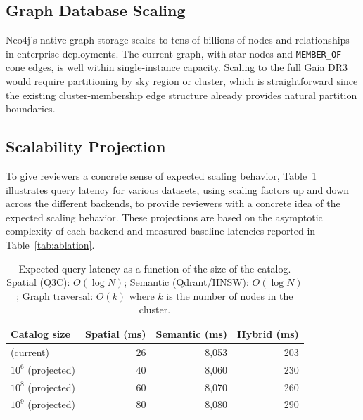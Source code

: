 \documentclass[preprint,12pt,authoryear]{elsarticle}
\begin{document}
\subsection{Graph Database Scaling}

Neo4j’s native graph storage scales to tens of billions of nodes and relationships in enterprise deployments. The current graph, with \nStarNodes{} star nodes and \nMemberOfEdges{} \texttt{MEMBER\_OF} cone edges, is well within single-instance capacity. Scaling to the full Gaia DR3 would require partitioning by sky region or cluster, which is straightforward since the existing cluster-membership edge structure already provides natural partition boundaries.

\subsection{Scalability Projection}

To give reviewers a concrete sense of expected scaling behavior, Table~\ref{tab:scaling} illustrates query latency for various datasets, using scaling factors up and down across the different backends, to provide reviewers with a concrete idea of the expected scaling behavior. These projections are based on the asymptotic complexity of each backend and measured baseline latencies reported in Table~\ref{tab:ablation}.

\begin{table}[htbp]
\centering
\caption{Expected query latency as a function of the size of the catalog. Spatial (Q3C): $O(\log N)$; Semantic (Qdrant/HNSW): $O(\log N)$; Graph traversal: $O(k)$ where $k$ is the number of nodes in the cluster.}
\label{tab:scaling}
\begin{tabular}{lrrr}
\toprule
\textbf{Catalog size} & \textbf{Spatial (ms)} & \textbf{Semantic (ms)} & \textbf{Hybrid (ms)} \\
\midrule
\nStarsReal{} (current) & 26 & 8{,}053 & 203 \\
$10^6$ (projected) & 40 & 8{,}060 & 230 \\
$10^8$ (projected) & 60 & 8{,}070 & 260 \\
$10^9$ (projected) & 80 & 8{,}080 & 290 \\
\bottomrule
\end{tabular}
\end{table}
\end{document}
